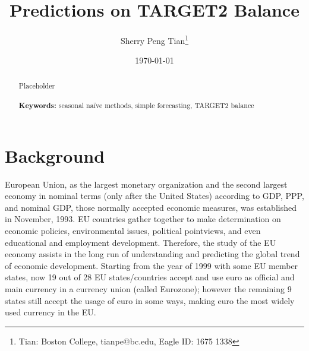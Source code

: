 \documentclass[12pt]{article}
\begin{document}
\begin{titlepage}
\title{Predictions on TARGET2 Balance}
\author{Sherry Peng Tian\thanks{Tian: Boston College, tianpe@bc.edu, Eagle ID: 1675 1338}}
\date{\today}
\maketitle
\begin{abstract}
\noindent Placeholder\\
\vspace{0in}\\
\noindent\textbf{Keywords:} seasonal naïve methods, simple forecasting, TARGET2 balance\\
\bigskip
\end{abstract}
\setcounter{page}{0}
\thispagestyle{empty}
\end{titlepage}

\pagebreak \newpage

\doublespacing




\section{Background} \label{sec:background}

European Union, as the largest monetary organization and the second largest economy in nominal terms (only after the United States) according to GDP, PPP, and nominal GDP, those normally accepted economic measures, was established in November, 1993. EU countries gather together to make determination on economic policies, environmental issues, political pointviews, and even educational and employment development. Therefore, the study of the EU economy assists in the long run of understanding and predicting the global trend of economic development. Starting from the year of 1999 with some EU member states, now 19 out of 28 EU states/countries accept and use euro as official and main currency in a currency union (called Eurozone); however the remaining 9 states still accept the usage of euro in some ways, making euro the most widely used currency in the EU. 
\end{document}
